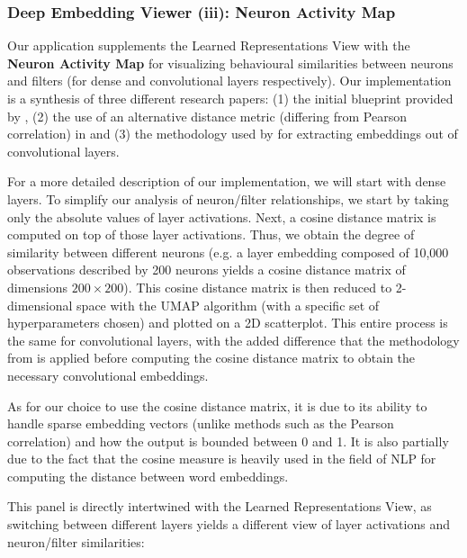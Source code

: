\vspace{0.2cm}
 
\subsubsection{Deep Embedding Viewer (iii): Neuron Activity Map}

Our application supplements the Learned Representations View with the \textbf{Neuron Activity Map} for visualizing behavioural similarities between neurons and filters (for dense and convolutional layers respectively). Our implementation is a synthesis of three different research papers: (1) the initial blueprint provided by \cite{Rauber2017VisualizingTH}, (2) the use of an alternative distance metric (differing from Pearson correlation) in \cite{Pezzotti2018DeepEyesPV} and (3) the methodology used by \cite{hohman2020summit} for extracting embeddings out of convolutional layers.


For a more detailed description of our implementation, we will start with dense layers. To simplify our analysis of neuron/filter relationships, we start by taking only the absolute values of layer activations. Next, a cosine distance matrix is computed on top of those layer activations. Thus, we obtain the degree of similarity between different neurons (e.g. a layer embedding composed of 10,000 observations described by 200 neurons yields a cosine distance matrix of dimensions $200 \times 200$). This cosine distance matrix is then reduced to 2-dimensional space with the UMAP algorithm (with a specific set of hyperparameters chosen) and plotted on a 2D scatterplot. This entire process is the same for convolutional layers, with the added difference that the methodology from \cite{hohman2020summit} is applied before computing the cosine distance matrix to obtain the necessary convolutional embeddings.


As for our choice to use the cosine distance matrix, it is due to its ability to handle sparse embedding vectors (unlike methods such as the Pearson correlation) and how the output is bounded between 0 and 1. It is also partially due to the fact that the cosine measure is heavily used in the field of NLP for computing the distance between word embeddings.

This panel is directly intertwined with the Learned Representations View, as switching between different layers yields a different view of layer activations and neuron/filter similarities:


\vspace{0.2cm}

